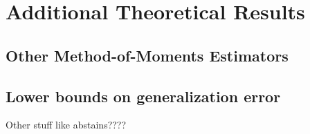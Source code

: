 \section{Additional Theoretical Results}



\subsection{Other Method-of-Moments Estimators}



\subsection{Lower bounds on generalization error}


Other stuff like abstains????